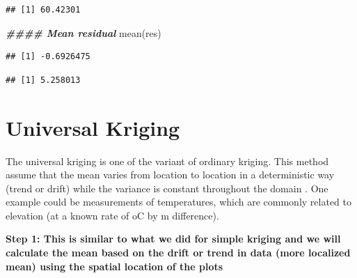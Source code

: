 \documentclass[
]{book}
\newenvironment{Shaded}{\begin{snugshade}}{\end{snugshade}}
\newcommand{\DecValTok}[1]{\textcolor[rgb]{0.00,0.00,0.81}{#1}}
\newcommand{\DocumentationTok}[1]{\textcolor[rgb]{0.56,0.35,0.01}{\textbf{\textit{#1}}}}
\newcommand{\FunctionTok}[1]{\textcolor[rgb]{0.00,0.00,0.00}{#1}}
\newcommand{\NormalTok}[1]{#1}
\newcommand{\SpecialCharTok}[1]{\textcolor[rgb]{0.00,0.00,0.00}{#1}}
\begin{document}
\begin{verbatim}
## [1] 60.42301
\end{verbatim}

\begin{Shaded}
\begin{Highlighting}[]
\DocumentationTok{\#\#\#\# Mean residual}
\FunctionTok{mean}\NormalTok{(res)}
\end{Highlighting}
\end{Shaded}

\begin{verbatim}
## [1] -0.6926475
\end{verbatim}

\begin{Shaded}
\end{Shaded}

\begin{verbatim}
## [1] 5.258013
\end{verbatim}

\hypertarget{universal-kriging}{%
\section{Universal Kriging}\label{universal-kriging}}

The universal kriging is one of the variant of ordinary kriging. This method assume that the mean varies from location to location in a deterministic way (trend or drift) while the variance is constant throughout the domain \citep{matheron1962trait}. One example could be measurements of temperatures, which are commonly related to elevation (at a known rate of oC by m difference).

\textbf{Step 1: This is similar to what we did for simple kriging and we will calculate the mean based on the drift or trend in data (more localized mean) using the spatial location of the plots}
\end{document}

